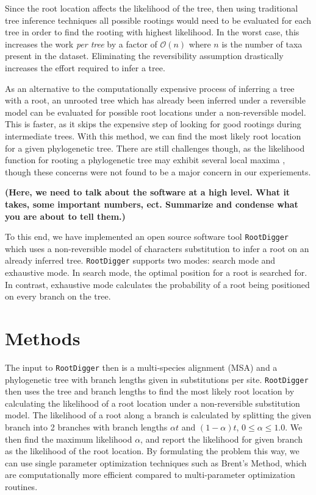\documentclass{article}
\newcommand{\RootDiggertt}{\texttt{RootDigger}}
\newcommand{\BenComment}[1]{{\bf \color{blue} ({#1})}}
\begin{document}
Since the root location affects the likelihood of the tree, then using
traditional tree inference techniques all possible rootings would need to be
evaluated for each tree in order to find the rooting with highest likelihood.
In the worst case, this increases the work {\em per tree} by a factor of
$\mathcal{O}(n)$ where $n$ is the number of taxa present in the dataset.
Eliminating the reversibility assumption drastically increases the effort
required to infer a tree.

As an alternative to the computationally expensive process of inferring a tree
with a root, an unrooted tree which has already been inferred under a reversible
model can be evaluated for possible root locations under a non-reversible model.
This is faster, as it skips the expensive step of looking for good rootings
during intermediate trees.  With this method, we can find the most likely root
location for a given phylogenetic tree.  There are still challenges though, as
the likelihood function for rooting a phylogenetic tree may exhibit several
local maxima \cite{huelsenbeck_inferring_2002}, though these concerns were not
found to be a major concern in our experiements.

\BenComment{Here, we need to talk about the software at a high level. What it
takes, some important numbers, ect. Summarize and condense what you are about to
tell them.}

To this end, we have implemented an open source software tool \RootDiggertt{}
which uses a non-reversible model of characters substitution to infer a root on
an already inferred tree. \RootDiggertt{} supports two modes: search mode and
exhaustive mode. In search mode, the optimal position for a root is searched
for. In contrast, exhaustive mode calculates the probability of a root being
positioned on every branch on the tree.

\section{Methods}

The input to \RootDiggertt{} then is a multi-species alignment (MSA) and a
phylogenetic tree with branch lengths given in substitutions per site.
\RootDiggertt{} then uses the tree and branch lengths to find the most likely
root location by calculating the likelihood of a root location under a
non-reversible substitution model.
The likelihood of a root along a branch is calculated by splitting the given
branch into 2 branches with branch lengths $\alpha t$ and $(1-\alpha) t$, $0
  \leq \alpha \leq 1.0$.
We then find the maximum likelihood $\alpha$, and report the likelihood for
given branch as the likelihood of the root location.
By formulating the problem this way, we can use single parameter optimization
techniques such as Brent's Method\footnotemark{}, which are computationally
more efficient compared to multi-parameter optimization routines.
\end{document}
